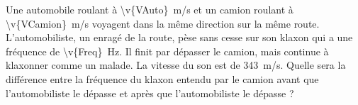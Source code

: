 Une automobile roulant à \qty{\v{VAuto}}{m/s} et un camion roulant à \qty{\v{VCamion}}{m/s} voyagent dans la même direction sur la même route. L’automobiliste, un enragé de la route, pèse sans cesse sur son klaxon qui a une fréquence de \qty{\v{Freq}}{Hz}. Il finit par dépasser le camion, mais continue à klaxonner comme un malade. La vitesse du son est de \qty{343}{m/s}. Quelle sera la différence entre la fréquence du klaxon entendu par le camion avant que l’automobiliste le dépasse et après que l’automobiliste le dépasse ?